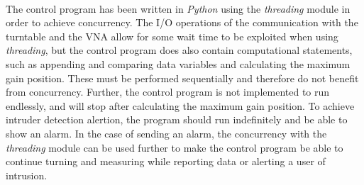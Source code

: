 \\[12pt]
The control program has been written in \textit{Python} using the \textit{threading} module in order to achieve concurrency. The I/O operations of the communication with the turntable and the VNA allow for some wait time to be exploited when using \textit{threading}, but the control program does also contain computational statements, such as appending and comparing data variables and calculating the maximum gain position. These must be performed sequentially and therefore do not benefit from concurrency. Further, the control program is not implemented to run endlessly, and will stop after calculating the maximum gain position. To achieve intruder detection alertion, the program should run indefinitely and be able to show an alarm. In the case of sending an alarm, the concurrency with the \textit{threading} module can be used further to make the control program be able to continue turning and measuring while reporting data or alerting a user of intrusion.

